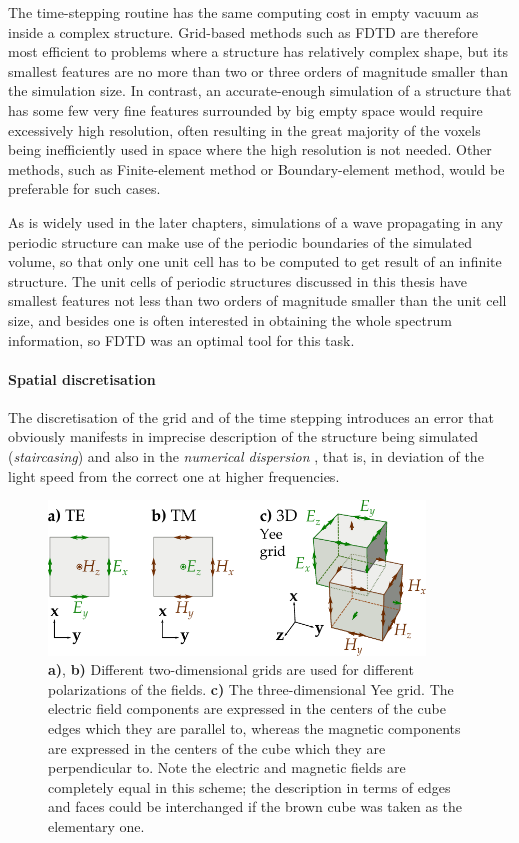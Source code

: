 The time-stepping routine has the same computing cost in empty vacuum as inside a complex structure. Grid-based methods such as FDTD are therefore most efficient to problems where a structure has relatively complex shape, but its smallest features are no more than two or three orders of magnitude smaller than the simulation size. In contrast, an accurate-enough simulation of a structure that has some few very fine features surrounded by big empty space would require excessively high resolution, often resulting in the great majority of the voxels being inefficiently used in space where the high resolution is not needed. Other methods, %
such as Finite-element method or Boundary-element method, would be preferable for such cases.

As is widely used in the later chapters,  %
simulations of a wave propagating in any periodic structure can make use of the periodic boundaries of the simulated volume, so that only one unit cell has to be computed to get result of an infinite structure. The unit cells of periodic structures discussed in this thesis have smallest features not less than two orders of magnitude smaller than the unit cell size, and besides one is often interested in obtaining the whole spectrum information, so FDTD was an optimal tool for this task.
\paragraph{Spatial discretisation} %
The discretisation of the grid and of the time stepping introduces an error that obviously manifests in imprecise description of the structure being simulated (\textit{staircasing}) and also in the \textit{numerical dispersion} \cite{taflove2005book}, that is, in deviation of the light speed from the correct one at higher frequencies.  %
\begin{figure}[h] \caption{\textbf{a)}, \textbf{b)} Different two-dimensional grids are used for different polarizations of the fields. \textbf{c)} The three-dimensional Yee grid. The electric field components are expressed in the centers of the cube edges which they are parallel to, whereas the magnetic components are expressed in the centers of the cube which they are perpendicular to. Note the electric and magnetic fields are completely equal in this scheme; the description in terms of edges and faces could be interchanged if the brown cube was taken as the elementary one.} \label{fg_fdtd_yee} \centering 
	\includegraphics[width=10cm]{img/FDTD_Yee_grid_2d-3d.pdf}
\end{figure}

